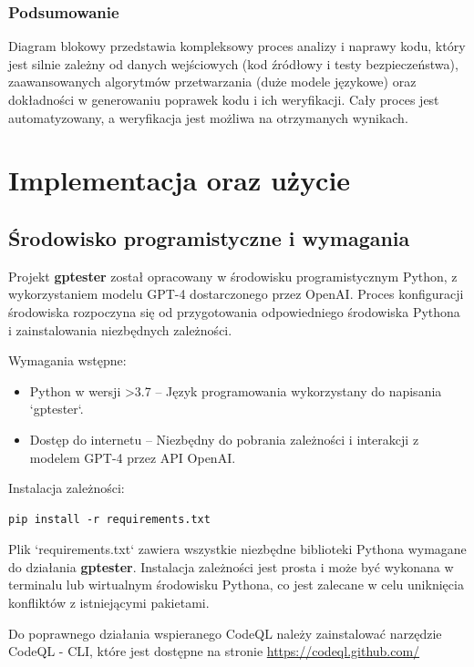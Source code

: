 \subsubsection{Podsumowanie}
Diagram blokowy przedstawia kompleksowy proces analizy i naprawy kodu, który jest silnie zależny od danych wejściowych (kod źródłowy i testy bezpieczeństwa), zaawansowanych algorytmów przetwarzania (duże modele językowe) oraz dokładności w generowaniu poprawek kodu i ich weryfikacji. Cały proces jest automatyzowany, a weryfikacja jest możliwa na otrzymanych wynikach.


\section{Implementacja oraz użycie}
\subsection{Środowisko programistyczne i wymagania}

Projekt \textbf{gptester} został opracowany w środowisku programistycznym Python, z wykorzystaniem modelu GPT-4 dostarczonego przez OpenAI. Proces konfiguracji środowiska rozpoczyna się od przygotowania odpowiedniego środowiska Pythona i zainstalowania niezbędnych zależności.

Wymagania wstępne:
\begin{itemize}
    \item Python w wersji >3.7 – Język programowania wykorzystany do napisania `gptester`.
    \item Dostęp do internetu – Niezbędny do pobrania zależności i interakcji z modelem GPT-4 przez API OpenAI.
\end{itemize}

Instalacja zależności:
\begin{listing}
    \begin{verbatim}
pip install -r requirements.txt
\end{verbatim}
\end{listing}

Plik `requirements.txt` zawiera wszystkie niezbędne biblioteki Pythona wymagane do działania \textbf{gptester}. 
Instalacja zależności jest prosta i może być wykonana w terminalu lub wirtualnym środowisku Pythona, co jest zalecane w celu uniknięcia konfliktów z istniejącymi pakietami.

Do poprawnego działania wspieranego CodeQL należy zainstalować narzędzie CodeQL - CLI, które jest dostępne na stronie \url{https://codeql.github.com/}
